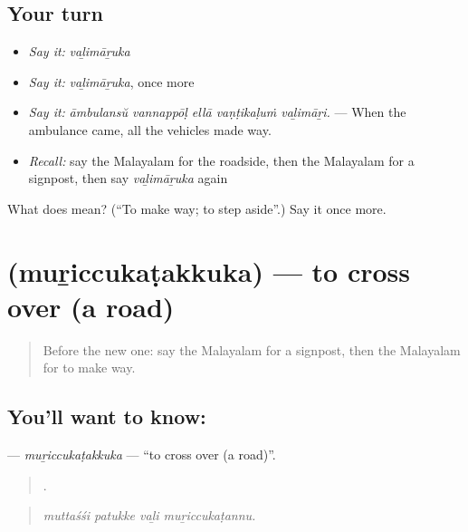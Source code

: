 \subsection*{Your turn}
\begin{itemize}
\raggedright
  \item \emph{Say it:} \emph{vaḻimāṟuka}
  \item \emph{Say it:} \emph{vaḻimāṟuka}, once more
  \item \emph{Say it:} \emph{āmbulansŭ vannappōḷ ellā vaṇṭikaḷuṁ vaḻimāṟi.} — When the ambulance came, all the vehicles made way.
  \item \emph{Recall:} say the Malayalam for the roadside, then the Malayalam for a signpost, then say \emph{vaḻimāṟuka} again
\end{itemize}

\begin{tcolorbox}[breakable,colback=teal!4,colframe=teal!35!black,title={Before you move on}]
What does  mean? (\textquotedblleft{}To make way; to step aside\textquotedblright{}.) Say it once more.
\end{tcolorbox}
\section[\texorpdfstring{\ml{മുറിച്ചുകടക്കുക} (muṟiccukaṭakkuka)}{മുറിച്ചുകടക്കുക (muṟiccukaṭakkuka)}]{ (muṟiccukaṭakkuka) — to cross over (a road)}

\label{lesson:ML-C469-muriccukatakkuka}



\begin{quote}
Before the new one: say the Malayalam for a signpost, then the Malayalam for to make way.
\end{quote}

\subsection*{You'll want to know: }
\textbf{} — \emph{muṟiccukaṭakkuka} — \textquotedblleft{}to cross over (a road)\textquotedblright{}.

\begin{quote}
   .
\end{quote}

\begin{quote}
\emph{muttaśśi patukke vaḻi muṟiccukaṭannu.}
\end{quote}

